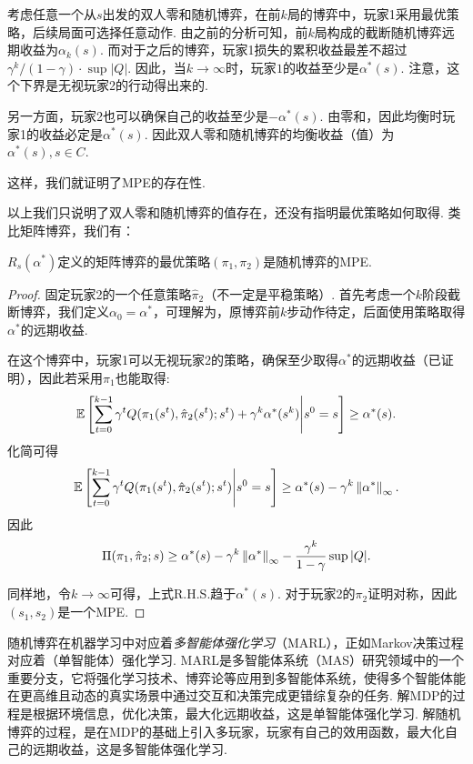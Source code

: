 考虑任意一个从$s$出发的双人零和随机博弈，在前$k$局的博弈中，玩家1采用最优策略，后续局面可选择任意动作. 由之前的分析可知，前$k$局构成的截断随机博弈远期收益为$\alpha_k(s)$. 而对于之后的博弈，玩家1损失的累积收益最差不超过$\gamma^k/(1-\gamma)\cdot \sup|Q|$. 因此，当$k\to\infty$时，玩家$1$的收益至少是$\alpha^*(s)$. 注意，这个下界是无视玩家2的行动得出来的.

另一方面，玩家2也可以确保自己的收益至少是$-\alpha^*(s)$. 由零和，因此均衡时玩家1的收益必定是$\alpha^*(s)$. 因此双人零和随机博弈的均衡收益（值）为$\alpha^*(s),s\in C$.

这样，我们就证明了MPE的存在性. 

以上我们只说明了双人零和随机博弈的值存在，还没有指明最优策略如何取得. 类比矩阵博弈，我们有：
\begin{theorem}
$R_s(\alpha^*)$定义的矩阵博弈的最优策略$(\pi_1,\pi_2)$是随机博弈的MPE. 
\end{theorem}
\begin{proof}
固定玩家2的一个任意策略$\hat{\pi}_2$（不一定是平稳策略）. 首先考虑一个$k$阶段截断博弈，我们定义$\alpha_0=\alpha^*$，可理解为，原博弈前$k$步动作待定，后面使用策略取得$\alpha^*$的远期收益.

在这个博弈中，玩家1可以无视玩家2的策略，确保至少取得$\alpha^*$的远期收益（已证明），因此若采用$\pi_1$也能取得:
\[\mathbb{E}\left[\sum_{t=0}^{k-1}\gamma^tQ(\pi_1(s^t),\hat{\pi}_2(s^t);s^t)+\gamma^k\alpha^*(s^k)\middle|s^0=s\right]\ge \alpha^*(s).\]
化简可得
\[\mathbb{E}\left[\sum_{t=0}^{k-1}\gamma^tQ(\pi_1(s^t),\hat{\pi}_2(s^t);s^t)\middle|s^0=s\right]\ge \alpha^*(s)-\gamma^k\left\|\alpha^*\right\|_\infty.\]
因此
\[\Pi(\pi_1,\hat{\pi}_2;s)\ge \alpha^*(s) - \gamma^k\left\|\alpha^*\right\|_\infty - \frac{\gamma^k}{1-\gamma}\sup|Q|.\]

同样地，令$k\to\infty$可得，上式R.H.S.趋于$\alpha^*(s)$. 对于玩家2的$\pi_2$证明对称，因此$(s_1,s_2)$是一个MPE.
\end{proof}

随机博弈在机器学习中对应着\emph{多智能体强化学习}（MARL），正如Markov决策过程对应着（单智能体）强化学习. MARL是多智能体系统（MAS）研究领域中的一个重要分支，它将强化学习技术、博弈论等应用到多智能体系统，使得多个智能体能在更高维且动态的真实场景中通过交互和决策完成更错综复杂的任务. 解MDP的过程是根据环境信息，优化决策，最大化远期收益，这是单智能体强化学习. 解随机博弈的过程，是在MDP的基础上引入多玩家，玩家有自己的效用函数，最大化自己的远期收益，这是多智能体强化学习. 